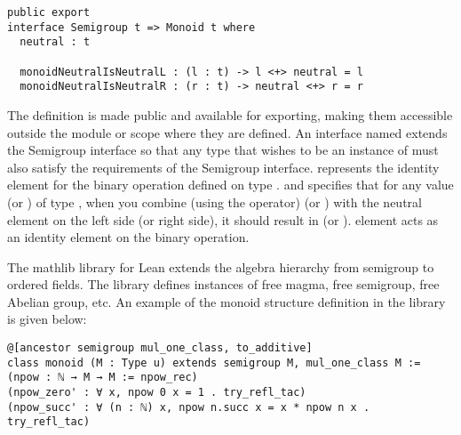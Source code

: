 \begin{verbatim}
public export
interface Semigroup t => Monoid t where
  neutral : t

  monoidNeutralIsNeutralL : (l : t) -> l <+> neutral = l
  monoidNeutralIsNeutralR : (r : t) -> neutral <+> r = r
\end{verbatim}

The definition is made public and available for exporting, making them
accessible outside the module or scope where they are defined. An interface
named  extends the Semigroup interface so that any
type  that wishes to be an instance of  must
also satisfy the requirements of the Semigroup interface.
 represents the identity element for the binary
operation defined on type .
 and
 specifies that for any value
 (or ) of type , when you combine (using the
\inline{<+>} operator)  (or ) with the neutral element on
the left side (or right side), it should result in  (or ).
 element acts as an identity element on the binary operation.

The mathlib library for Lean extends the algebra hierarchy from semigroup to
ordered fields. The library defines instances of free magma, free semigroup,
free Abelian group, etc. An example of the monoid structure definition in the
library is given below:

\begin{verbatim}
@[ancestor semigroup mul_one_class, to_additive]
class monoid (M : Type u) extends semigroup M, mul_one_class M :=
(npow : ℕ → M → M := npow_rec)
(npow_zero' : ∀ x, npow 0 x = 1 . try_refl_tac)
(npow_succ' : ∀ (n : ℕ) x, npow n.succ x = x * npow n x . try_refl_tac)
\end{verbatim}

